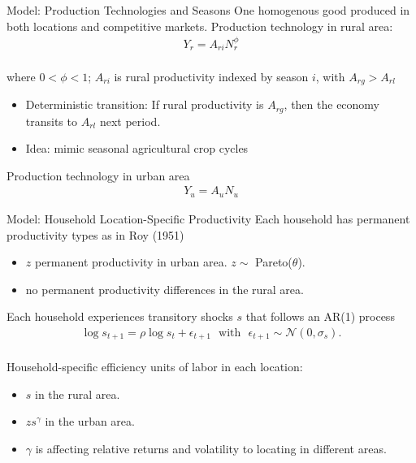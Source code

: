 \documentclass[9pt,pdftex,aspectratio=1610]{beamer}
\theoremstyle{definition}
\begin{document}
\begin{frame}[t]{Model: Production Technologies and Seasons}
One homogenous good produced in both locations and competitive markets.
\medskip
Production technology in rural area:
\begin{align*}
Y_r = A_{ri} N_r^{\phi}
\end{align*}\\
where $0<\phi<1$; $A_{ri}$ is rural productivity indexed by season $i$, with $A_{rg} > A_{rl}$ \\
\begin{itemize}
\smallskip
\item Deterministic transition: If rural productivity is $A_{rg}$, then the economy transits to $A_{rl}$ next period.
\smallskip
\item Idea: mimic seasonal agricultural crop cycles
\smallskip
\end{itemize}
\medskip
Production technology in urban area
\begin{align*}
Y_u = A_u N_u
\end{align*}
\end{frame}


\begin{frame}[t]{Model: Household Location-Specific Productivity}
Each household has permanent productivity types as in Roy (1951)
\begin{itemize}
\smallskip
\item $z$ permanent productivity in urban area. $z \sim$ Pareto($\theta$).
\smallskip
\item no permanent productivity differences in the rural area.
\end{itemize}
\bigskip
Each household experiences transitory shocks $s$ that follows an AR(1) process
\begin{align*}
\log s_{t+1} = \rho \log s_{t} + \epsilon_{t+1} \ \ \  \mbox{with} \ \  \ \epsilon_{t+1} \sim \mathcal{N}(0,\sigma_{s}).
\end{align*}\\
\bigskip
Household-specific efficiency units of labor in each location:
\begin{itemize}
\smallskip
\item $s$ in the rural area.
\smallskip
\item $zs^\gamma$ in the urban area.
\smallskip
\item $\gamma$ is affecting relative returns and volatility to locating in different areas.
\end{itemize}
\end{frame}
\end{document}
